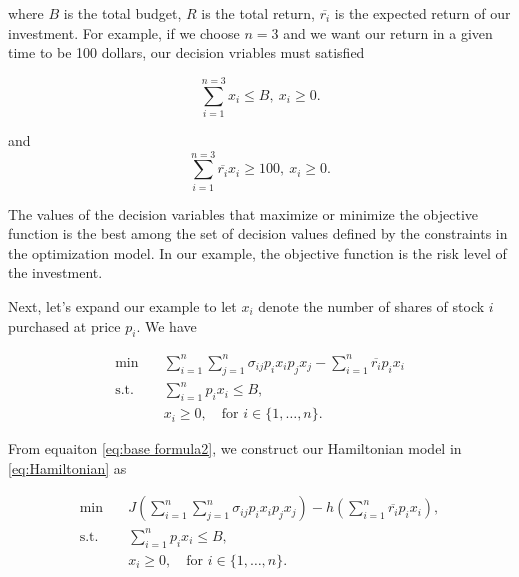 \documentclass[12pt]{article}
\begin{document}
where $B$ is the total budget, $R$ is the total return, $\overline{r_{i}}$ is the expected return of our investment. For example, if we choose $n=3$ and we want our return in a given time to be 100 dollars, our decision vriables must satisfied 

\begin{equation}
\sum_{i=1}^{n=3} x_{i} \leq B,\ x_{i}\geq 0.
\end{equation} 

and 
\begin{equation}
    \sum_{i=1}^{n=3} \overline{r_{i}}x_{i} \geq 100,\ x_{i}\geq 0.
\end{equation} 

The values of the decision variables that maximize or minimize the objective function is the best among the set of decision values defined by the constraints in the optimization model. In our example, the objective function is the risk level of the investment.

Next, let's expand our example to let $x_{i}$ denote the number of shares of stock $i$ purchased at price $p_{i}$. We have 

\begin{equation}
    \begin{aligned}
    \text{min} \quad  & \sum_{i=1}^{n}\sum_{j=1}^{n} \sigma_{ij}p_{i}x_{i}p_{j}x_{j} - \sum_{i=1}^{n} \overline{r_{i}} p_{i}x_{i}  \\
    \text{s.t.} \quad  &\sum_{i=1}^{n} p_{i}x_{i} \leq B, \\
                & x_{i} \geq 0, \quad \text{for } i \in \{1, \dots, n\}.
    \end{aligned}
    \label{eq:base formula2}
\end{equation}

From equaiton \ref{eq:base formula2}, we construct our Hamiltonian model in \ref{eq:Hamiltonian} as 

\begin{equation}
    \begin{aligned}
    \min \quad & J(\sum_{i=1}^{n}\sum_{j=1}^{n} \sigma_{ij}p_{i}x_{i}p_{j}x_{j}) - h( \sum_{i=1}^{n}\overline{r_{i}} p_{i}x_{i}),  \\
    \text{s.t.} \quad &\sum_{i=1}^{n} p_{i}x_{i} \leq B, \\
    & x_{i} \geq 0, \quad \text{for } i \in \{1, \dots, n\}.
    \end{aligned}
\label{eq:Form Hamiltonian}
\end{equation}
\end{document}
